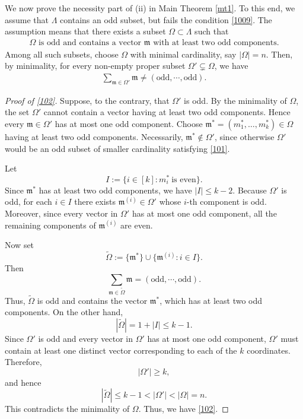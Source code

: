 \documentclass[10pt,a4paper]{amsart}
\numberwithin{equation}{section}
\begin{document}
We now prove the necessity part of (ii) in Main Theorem \ref{mt1}.  
To this end, we assume that 
$\Lambda$ contains an odd subset, but fails the condition \eqref{1009}.
The assumption  means that there exists a subset $\Omega\subset \Lambda$ such that
\begin{align}\label{101}
\text{$\Omega$ is odd and contains a vector $\mathfrak{m}$ with at least two odd components.}
\end{align}
Among all such subsets, choose $\Omega$ with minimal cardinality, say $|\Omega|=n$. Then, by minimality, for every non-empty proper subset $\Omega'\subsetneq \Omega$, we have
\begin{align}\label{102}
\sum_{\mathfrak{m}\in \Omega'} \mathfrak{m} \neq (\text{odd},\cdots,\text{odd}).
\end{align}
\begin{proof}[Proof of \eqref{102}]
Suppose, to the contrary, that
	$\Omega'$ is odd. By the minimality of $\Omega$, the set $\Omega'$ cannot contain a vector
	having at least two odd components. Hence every
	$\mathfrak m\in\Omega'$ has at most one odd component. Choose
	$\mathfrak m^{*}
	=
	(m_1^{*},\ldots,m_k^{*})
	\in\Omega$
	having at least two odd components. Necessarily,
	$\mathfrak m^{*}\notin\Omega'$, since otherwise $\Omega'$ would be an
	odd subset of smaller cardinality satisfying \eqref{101}.
	

	Let
	\[
	I:=\{i\in[k]:m_i^{*}\ \text{is even}\}.
	\]
	Since $\mathfrak m^{*}$ has at least two odd components, we have
	$|I|\leq k-2.$
	Because $\Omega'$ is odd, for each $i\in I$ there exists
	$\mathfrak m^{(i)}\in\Omega'$ whose $i$-th component is odd.
	Moreover, since every vector in $\Omega'$ has at most one odd component,
	all the remaining components of $\mathfrak m^{(i)}$ are even.
	
	
	
	Now set
	\[
	\widetilde{\Omega}
	:=
	\{\mathfrak m^{*}\}
	\cup
	\{\mathfrak m^{(i)}:i\in I\}.
	\]
	Then
	\[
	\sum_{\mathfrak m\in\widetilde{\Omega}}\mathfrak m
	=
	(\text{odd},\cdots,\text{odd}).
	\]
	Thus, $\widetilde{\Omega}$ is odd and contains the vector
	$\mathfrak m^{*}$, which has at least two odd components. On the other
	hand,
	\[
	|\widetilde{\Omega}|
	=
	1+|I|
	\leq k-1.
	\]
	Since $\Omega'$ is odd and every vector in $\Omega'$ has at most one
	odd component, $\Omega'$ must contain at least one distinct vector
	corresponding to each of the $k$ coordinates. Therefore,
	\[
	|\Omega'|\geq k,
	\]
	and hence
	\[
	|\widetilde{\Omega}|
	\leq k-1
	<
	|\Omega'|
	<
	|\Omega|=n.
	\]
	This contradicts the minimality of $\Omega$. Thus, we have \eqref{102}.
\end{proof}
\end{document}
